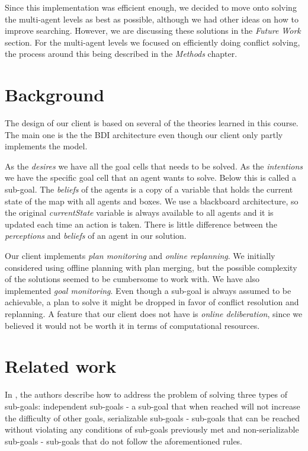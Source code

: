 \documentclass[letterpaper]{article}
\begin{document}
Since this implementation was efficient enough, we decided to move onto solving the multi-agent levels as best as possible, although we had other ideas on how to improve searching. However, we are discussing these solutions in the \textit{Future Work} section. For the multi-agent levels we focused on efficiently doing conflict solving, the process around this being described in the \textit{Methods} chapter.

\section{Background}
The design of our client is based on several of the theories learned in this course. The main one is the the BDI architecture even though our client only partly implements the model. 

As the \textit{desires} we have all the goal cells that needs to be solved. As the \textit{intentions} we have the specific goal cell that an agent wants to solve. Below this is called a sub-goal. The \textit{beliefs} of the agents is a copy of a variable that holds the current state of the map with all agents and boxes. We use a blackboard architecture, so the original \textit{currentState} variable is always available to all agents and it is updated each time an action is taken. There is little difference between the \textit{perceptions} and \textit{beliefs} of an agent in our solution.

Our client implements \textit{plan monitoring} and \textit{online replanning}. We initially considered using offline planning with plan merging, but the possible complexity of the solutions seemed to be cumbersome to work with. We have also implemented \textit{goal monitoring}. Even though a sub-goal is always assumed to be achievable, a plan to solve it might be dropped in favor of conflict resolution and replanning. A feature that our client does not have is \textit{online deliberation}, since we believed it would not be worth it in terms of computational resources. 

\section{Related work}
In \cite{recursiveSubgoals}, the authors describe how to address the problem of solving three types of sub-goals: independent sub-goals - a sub-goal that when reached will not increase the difficulty of other goals, serializable sub-goals - sub-goals that can be reached without violating any conditions of sub-goals previously met and non-serializable sub-goals - sub-goals that do not follow the aforementioned rules.
\end{document}

